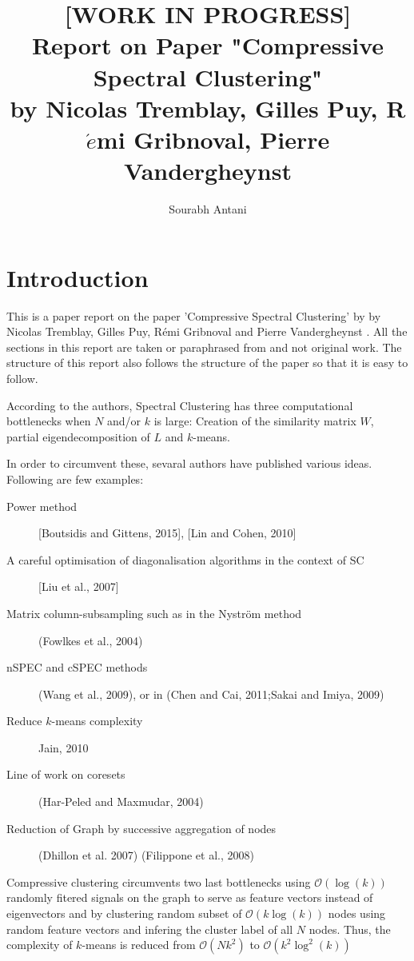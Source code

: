 \documentclass[10pt,a4paper, nocenter]{report}
\author{Sourabh Antani}
\title{[WORK IN PROGRESS] \\ Report on Paper "Compressive Spectral Clustering" \\by Nicolas Tremblay, Gilles Puy, R$\acute{e}$mi Gribnoval, Pierre Vandergheynst}
\date{}
\theoremstyle{definition}
\begin{document}
	\maketitle

	
	\chapter{Introduction}
	\thispagestyle{fancy}
	This is a paper report on the paper 'Compressive Spectral Clustering' by by Nicolas Tremblay, Gilles Puy, R\'{e}mi Gribnoval and Pierre Vandergheynst \cite{tremblay-compressive-SC-16}. All the sections in this report are taken or paraphrased from \cite{tremblay-compressive-SC-16} and not original work. The structure of this report also follows the structure of the paper so that it is easy to follow.

	According to the authors, Spectral Clustering has three computational bottlenecks when $N$ and/or $k$ is large: Creation of the similarity matrix $W$, partial eigendecomposition of $L$ and $k$-means.
	
	In order to circumvent these, sevaral authors have published various ideas. Following are few examples:
	\begin{description}
		\item[Power method] [Boutsidis and Gittens, 2015], [Lin and Cohen,  2010]
		\item[A  careful  optimisation  of  diagonalisation  algorithms  in  the  context  of  SC]  [Liu  et  al.,  2007]
		\item[Matrix column-subsampling such as in the Nystr\"{o}m method]  (Fowlkes  et  al.,  2004)
		\item[nSPEC  and  cSPEC methods] (Wang et al., 2009), or in (Chen and Cai, 2011;Sakai and Imiya, 2009)
		\item[Reduce $k$-means complexity] Jain, 2010
		\item[Line of work on coresets] (Har-Peled and Maxmudar, 2004)
		\item[Reduction of Graph by successive aggregation of nodes] (Dhillon et al. 2007) (Filippone et al., 2008)
	\end{description}
	
	Compressive clustering circumvents two last bottlenecks using $\mathcal{O}(\log(k))$ randomly fitered signals on the graph to serve as feature vectors instead of eigenvectors and by clustering random subset of $\mathcal{O}(k\log(k))$ nodes using random feature vectors and infering the cluster label of all $N$ nodes. Thus, the complexity of $k$-means is reduced from $\mathcal{O}(Nk^{2})$ to $\mathcal{O}(k^2\log^2(k))$
	
\end{document}
